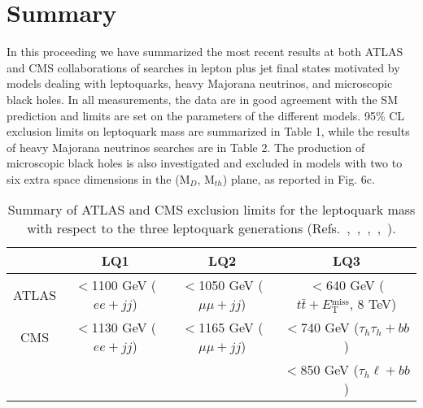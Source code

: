 \documentclass[10pt]{article}
\begin{document}
\vspace{-0.35cm}
\section{Summary}
\label{Summary}
\vspace{-0.15cm}
In this proceeding we have summarized the most recent results at both ATLAS and CMS collaborations of searches in lepton plus jet final states 
motivated by models dealing with leptoquarks, heavy Majorana neutrinos, and microscopic black holes.
In all measurements, the data are in good agreement with the SM prediction and limits are set on the parameters of the different models.
95\% CL exclusion limits on leptoquark mass are summarized in Table 1, while the results of heavy Majorana neutrinos searches are in Table 2. 
The production of microscopic black holes is also investigated and excluded in models with two to six extra space dimensions in the (M$_D$, M$_{th}$) plane, as reported in Fig. 6c.

\begin{table}[h!]
\begin{center}
{\scriptsize 
\begin{tabular}{|c|c|c|c|}
\hline
               & LQ1                       & LQ2                            & LQ3 \\
\hline
 ATLAS         & $<$1100 GeV ($ee+jj$)     & $<$1050 GeV ($\mu\mu+jj$)      &  $<$640 GeV ($t\bar{t}+E\mathrm{^{miss}_T}$, 8 TeV)     \\
\hline
 CMS           & $<$1130 GeV ($ee+jj$)     & $<$1165 GeV ($\mu\mu+jj$)      &  $<$740 GeV ($\tau_h \tau_h+bb$)     \\
               &                           &                                &  $<$850 GeV ($\tau_h \ell +bb$)      \\
\hline
\end{tabular}
}
\end{center}
\label{LQsummary}
\vspace{-0.35cm}
\caption{Summary of ATLAS and CMS exclusion limits for the leptoquark mass with respect to the three leptoquark generations (Refs.~\cite{LQ_ATLAS},~\cite{LQ1_CMS},~\cite{LQ2_CMS},~\cite{LQ3015_CMS},~\cite{LQ3016_CMS}).}
\end{table}  
\end{document}

